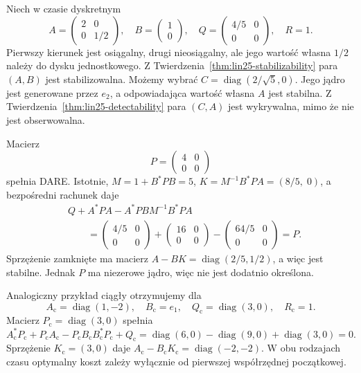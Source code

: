\begin{przyklad}
\label{prz:lin26-singular}
Niech w czasie dyskretnym
\[
 A=\begin{pmatrix}2&0\\0&1/2\end{pmatrix},
 \quad
 B=\begin{pmatrix}1\\0\end{pmatrix},
 \quad
 Q=\begin{pmatrix}4/5&0\\0&0\end{pmatrix},
 \quad R=1.
\]
Pierwszy kierunek
jest osiągalny,
drugi nieosiągalny,
ale jego wartość własna
\(1/2\) należy
do dysku jednostkowego.
Z
Twierdzenia~\ref{thm:lin25-stabilizability}
para \((A,B)\)
jest stabilizowalna.
Możemy wybrać
\(C=\operatorname{diag}(2/\sqrt5,0)\).
Jego jądro jest generowane
przez \(e_2\),
a odpowiadająca
wartość własna \(A\)
jest stabilna.
Z
Twierdzenia~\ref{thm:lin25-detectability}
para \((C,A)\)
jest wykrywalna,
mimo że nie jest obserwowalna.

Macierz
\[
 P=\begin{pmatrix}4&0\\0&0\end{pmatrix}
\]
spełnia DARE.
Istotnie,
\(M=1+B^*PB=5\),
\(K=M^{-1}B^*PA=(8/5,\;0)\),
a bezpośredni rachunek daje
\[
 \begin{aligned}
 &Q+A^*PA-A^*PBM^{-1}B^*PA\\
 &\qquad
 =\begin{pmatrix}4/5&0\\0&0\end{pmatrix}
  +\begin{pmatrix}16&0\\0&0\end{pmatrix}
  -\begin{pmatrix}64/5&0\\0&0\end{pmatrix}
 =P.
 \end{aligned}
\]
Sprzężenie zamknięte ma
macierz
\(A-BK=\operatorname{diag}(2/5,1/2)\),
a więc jest stabilne.
Jednak \(P\) ma
niezerowe jądro,
więc nie jest
dodatnio określona.

Analogiczny przykład ciągły
otrzymujemy dla
\[
 A_{\mathrm c}=\operatorname{diag}(1,-2),
 \quad B_{\mathrm c}=e_1,\quad
 Q_{\mathrm c}=\operatorname{diag}(3,0),
 \quad R_{\mathrm c}=1.
\]
Macierz
\(P_{\mathrm c}=\operatorname{diag}(3,0)\)
spełnia
\[
 A_{\mathrm c}^*P_{\mathrm c}
 +P_{\mathrm c}A_{\mathrm c}
 -P_{\mathrm c}B_{\mathrm c}
     B_{\mathrm c}^*P_{\mathrm c}
 +Q_{\mathrm c}
 =\operatorname{diag}(6,0)
  -\operatorname{diag}(9,0)
  +\operatorname{diag}(3,0)=0.
\]
Sprzężenie \(K_{\mathrm c}=(3,0)\)
daje
\(A_{\mathrm c}-B_{\mathrm c}K_{\mathrm c}
 =\operatorname{diag}(-2,-2)\).
W obu rodzajach czasu
optymalny koszt zależy
wyłącznie od pierwszej
współrzędnej początkowej.
\end{przyklad}

